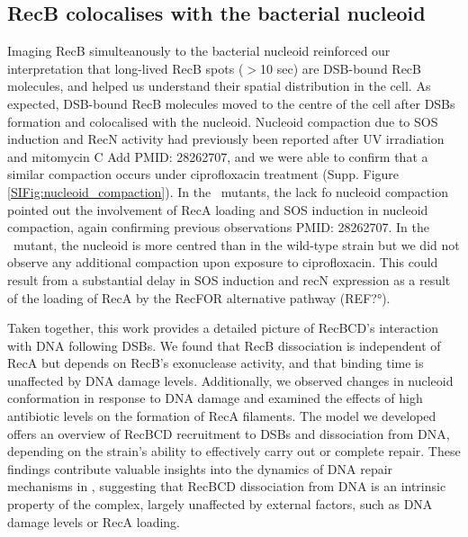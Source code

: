 \subsection*{RecB colocalises with the bacterial nucleoid}
Imaging RecB simulteanously to the bacterial nucleoid reinforced our interpretation that long-lived RecB spots ($>$10 sec) are DSB-bound RecB molecules, and helped us understand their spatial distribution in the cell. As expected, DSB-bound RecB molecules moved to the centre of the cell after DSBs formation and colocalised with the nucleoid. Nucleoid compaction due to SOS induction and RecN activity had previously been reported after UV irradiation and mitomycin C \cite{Odsbu2014} Add PMID: 28262707, and we were able to confirm that a similar compaction occurs under ciprofloxacin treatment (Supp. Figure \ref{SIFig:nucleoid_compaction}). In the \dreca\ mutants, the lack fo nucleoid compaction pointed out the involvement of RecA loading and SOS induction in nucleoid compaction, again confirming previous observations \cite{Odsbu2014}PMID: 28262707. In the \geneteneighty\ mutant, the nucleoid is more centred than in the wild-type strain but we did not observe any additional compaction upon exposure to ciprofloxacin. This could result from a substantial delay in SOS induction and recN expression as a result of the loading of RecA by the RecFOR alternative pathway (REF?°).

Taken together, this work provides a detailed picture of RecBCD's interaction with DNA following DSBs. We found that RecB dissociation is independent of RecA but depends on RecB's exonuclease activity, and that binding time is unaffected by DNA damage levels. Additionally, we observed changes in nucleoid conformation in response to DNA damage and examined the effects of high antibiotic levels on the formation of RecA filaments. The model we developed offers an overview of RecBCD recruitment to DSBs and dissociation from DNA, depending on the strain's ability to effectively carry out or complete repair.
These findings contribute valuable insights into the dynamics of DNA repair mechanisms in \ecoli, suggesting that RecBCD dissociation from DNA is an intrinsic property of the complex, largely unaffected by external factors, such as DNA damage levels or RecA loading.